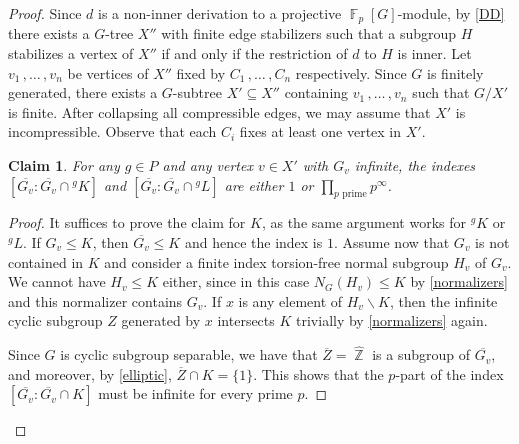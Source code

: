 \documentclass[a4paper]{amsart}
\newtheorem{claim}[lem]{Claim}
\theoremstyle{definition}
\theoremstyle{remark}
\DeclareMathOperator{\bbz}{\mathbb{Z}}
\DeclareMathOperator{\bbf}{\mathbb{F}}
\newcommand{\Falgebra}[1]{\bbf_p[#1]}
\begin{document}
\begin{proof}
 
Since \(d\) is a non-inner derivation to a projective \(\Falgebra{G}\)-module, by \cref{DD} there exists a \(G\)-tree \(X''\) with finite edge stabilizers such that a subgroup \(H\) stabilizes a vertex of \(X''\) if and only if the restriction of \(d\) to \(H\) is inner.  
Let \(v_1\,, \ldots\,, v_n\) be vertices of \(X''\) fixed by \(C_1\,, \ldots\,, C_n\) respectively. Since \(G\) is finitely generated, there exists a \(G\)-subtree \(X' \subseteq X''\) containing \(v_1\,, \ldots\,, v_n\) such that \(G / X'\) is finite. After collapsing all compressible edges, we may assume that \(X'\) is incompressible.  Observe that each \(C_i\) fixes at least one vertex in \(X'\).

\begin{claim}\label{p-part-infinite} For any \(g \in P\) and any vertex \(v \in X'\) with \(G_v\) infinite, the indexes \([\overline{G_v}\colon \overline{G_v}\cap {^gK}]\) and \([\overline{G_v}\colon \overline{G_v}\cap {^gL}]\) are either \(1\) or \(\prod_{p\text{ prime}} p^\infty\).
\end{claim}
\begin{proof}
It suffices to prove the claim for \(K\), as the same argument works for \(^gK\) or \(^gL\). If \(G_v \leq {K}\), then \(\overline {G_v} \leq {K}\) and hence the index is \(1\). Assume now that \(G_v\) is not contained in \(K\) and consider a finite index torsion-free normal subgroup \(H_v\) of \(G_v\). We cannot have \(H_v \leq {K}\) either, since in this case \(N_G(H_v)\leq {K}\) by \cref{normalizers} and this normalizer contains  \(G_v\). If \(x\) is any element of \(H_v \smallsetminus {K}\), then the infinite cyclic subgroup \(Z\) generated by \(x\) intersects \({K}\) trivially by \cref{normalizers} again.

Since \(G\) is cyclic subgroup separable, we have that \(\overline{Z} = \widehat{\bbz}\) is a subgroup of \(\overline {G_v}\), and moreover, by \cref{elliptic}, \(\overline{Z} \cap {K} = \{1\}\). This shows that the \(p\)-part of the index \([\overline {G_v}\colon \overline {G_v} \cap {K}]\) must be infinite for every prime \(p\).
\end{proof}


\end{proof}
\end{document}
